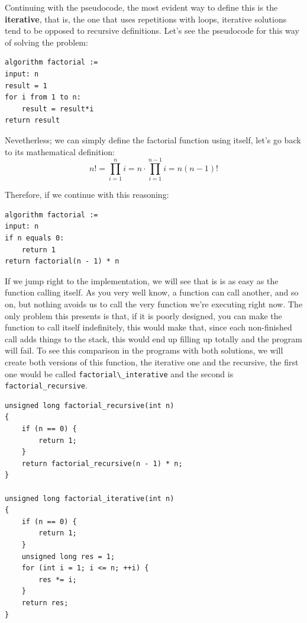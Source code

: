 \documentclass[a4paper]{article}
\begin{document}
Continuing with the pseudocode, the most evident way to define this is the
\textbf{iterative}, that is, the one that uses repetitions with loops, iterative
solutions tend to be opposed to recursive definitions. Let's see the pseudocode
for this way of solving the problem:

\begin{lstlisting}[style=pseudoCode]
algorithm factorial :=
input: n
result = 1
for i from 1 to n:
    result = result*i
return result
\end{lstlisting}

Nevetherless; we can simply define the factorial function using itself,
let's go back to its mathematical definition:
$$
n! = \prod^{n}_{i=1}{i}= n\!\cdot\!\!\prod^{n-1}_{i=1}{i} = n\left(n-1\right)!
$$

Therefore, if we continue with this reasoning:

\begin{lstlisting}[style=pseudoCode]
algorithm factorial :=
input: n
if n equals 0:
    return 1
return factorial(n - 1) * n
\end{lstlisting}

If we jump right to the implementation, we will see that is is as easy as the
function calling itself. As you very well know, a function can call another,
and so on, but nothing avoids us to call the very function we're executing right
now. The only problem this presents is that, if it is poorly designed, you can
make the function to call itself indefinitely, this would make that, since
each non-finished call adds things to the stack, this would end up filling up
totally and the program will fail.
To see this comparison in the programs with both solutions, we will create both
versions of this function, the iterative one and the recursive, the first one
would be called \verb!factorial\_interative! and the second is
\texttt{factorial\_recursive}.

\noindent
\begin{minipage}[H]{\linewidth}
\mbox{}
\begin{lstlisting}[style=C,
caption={Comparison of iterative and recursive algorithms},
label={lst:factorialIterativeVsRecursive}]
unsigned long factorial_recursive(int n)
{
    if (n == 0) {
        return 1;
    }
    return factorial_recursive(n - 1) * n;
}

unsigned long factorial_iterative(int n)
{
    if (n == 0) {
        return 1;
    }
    unsigned long res = 1;
    for (int i = 1; i <= n; ++i) {
        res *= i;
    }
    return res;
}
\end{lstlisting}
\end{minipage}
\end{document}

